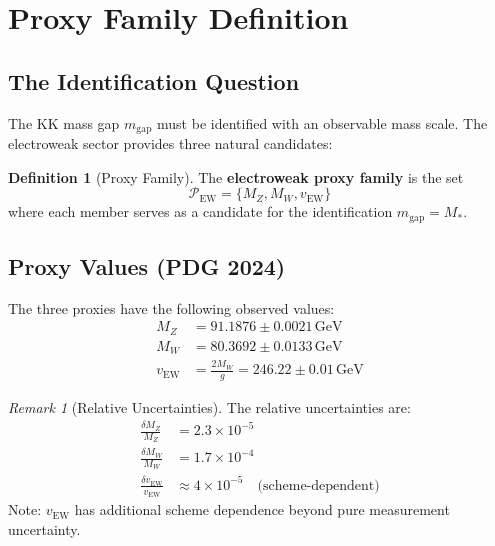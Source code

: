 \documentclass[11pt,a4paper]{article}
\newcommand{\mgap}{m_{\mathrm{gap}}}
\newcommand{\MZ}{M_Z}
\newcommand{\MW}{M_W}
\newcommand{\vEW}{v_{\mathrm{EW}}}
\newcommand{\Mstar}{M_*}
\newcommand{\GeV}{\,\mathrm{GeV}}
\theoremstyle{definition}
\newtheorem{definition}{Definition}[section]
\theoremstyle{plain}
\theoremstyle{remark}
\newtheorem{remark}{Remark}[section]
\begin{document}
\section{Proxy Family Definition}
\label{sec:proxy-family}

\subsection{The Identification Question}

The KK mass gap $\mgap$ must be identified with an observable mass scale.
The electroweak sector provides three natural candidates:

\begin{definition}[Proxy Family]
\label{def:proxy-family}
The \textbf{electroweak proxy family} is the set
\begin{equation}
\mathcal{P}_{\mathrm{EW}} = \{\MZ, \MW, \vEW\}
\label{eq:proxy-family}
\end{equation}
where each member serves as a candidate for the identification $\mgap = \Mstar$.
\end{definition}

\subsection{Proxy Values (PDG 2024)}

The three proxies have the following observed values:
\begin{align}
\MZ &= 91.1876 \pm 0.0021\GeV \label{eq:MZ-value} \\
\MW &= 80.3692 \pm 0.0133\GeV \label{eq:MW-value} \\
\vEW &= \frac{2\MW}{g} = 246.22 \pm 0.01\GeV \label{eq:vEW-value}
\end{align}

\begin{remark}[Relative Uncertainties]
The relative uncertainties are:
\begin{align}
\frac{\delta\MZ}{\MZ} &= 2.3 \times 10^{-5} \label{eq:dMZ-rel} \\
\frac{\delta\MW}{\MW} &= 1.7 \times 10^{-4} \label{eq:dMW-rel} \\
\frac{\delta\vEW}{\vEW} &\approx 4 \times 10^{-5} \quad \text{(scheme-dependent)} \label{eq:dvEW-rel}
\end{align}
Note: $\vEW$ has additional scheme dependence beyond pure measurement uncertainty.
\end{remark}
\end{document}
